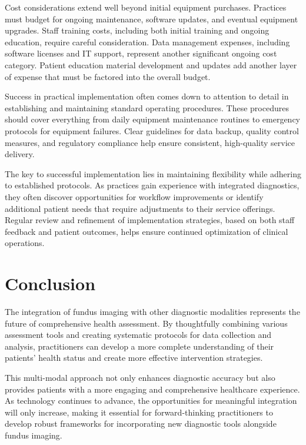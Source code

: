 \documentclass[
  Letterpaper,
]{scrbook}
\begin{document}
Cost considerations extend well beyond initial equipment purchases.
Practices must budget for ongoing maintenance, software updates, and
eventual equipment upgrades. Staff training costs, including both
initial training and ongoing education, require careful consideration.
Data management expenses, including software licenses and IT support,
represent another significant ongoing cost category. Patient education
material development and updates add another layer of expense that must
be factored into the overall budget.

Success in practical implementation often comes down to attention to
detail in establishing and maintaining standard operating procedures.
These procedures should cover everything from daily equipment
maintenance routines to emergency protocols for equipment failures.
Clear guidelines for data backup, quality control measures, and
regulatory compliance help ensure consistent, high-quality service
delivery.

The key to successful implementation lies in maintaining flexibility
while adhering to established protocols. As practices gain experience
with integrated diagnostics, they often discover opportunities for
workflow improvements or identify additional patient needs that require
adjustments to their service offerings. Regular review and refinement of
implementation strategies, based on both staff feedback and patient
outcomes, helps ensure continued optimization of clinical operations.

\section{Conclusion}\label{conclusion-4}

The integration of fundus imaging with other diagnostic modalities
represents the future of comprehensive health assessment. By
thoughtfully combining various assessment tools and creating systematic
protocols for data collection and analysis, practitioners can develop a
more complete understanding of their patients' health status and create
more effective intervention strategies.

This multi-modal approach not only enhances diagnostic accuracy but also
provides patients with a more engaging and comprehensive healthcare
experience. As technology continues to advance, the opportunities for
meaningful integration will only increase, making it essential for
forward-thinking practitioners to develop robust frameworks for
incorporating new diagnostic tools alongside fundus imaging.
\end{document}
